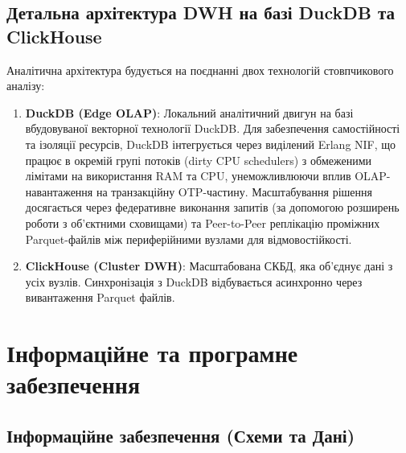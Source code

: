 \documentclass{article}
\begin{document}
\subsection{Детальна архітектура DWH на базі DuckDB та ClickHouse}
Аналітична архітектура будується на поєднанні двох технологій стовпчикового аналізу:
\begin{enumerate}
    \item \textbf{DuckDB (Edge OLAP)}:
    Локальний аналітичний двигун на базі вбудовуваної векторної технології DuckDB. Для забезпечення самостійності та ізоляції ресурсів, DuckDB інтегрується через виділений Erlang NIF, що працює в окремій групі потоків (dirty CPU schedulers) з обмеженими лімітами на використання RAM та CPU, унеможливлюючи вплив OLAP-навантаження на транзакційну OTP-частину. Масштабування рішення досягається через федеративне виконання запитів (за допомогою розширень роботи з об'єктними сховищами) та Peer-to-Peer реплікацію проміжних Parquet-файлів між периферійними вузлами для відмовостійкості.
    \item \textbf{ClickHouse (Cluster DWH)}:
    Масштабована СКБД, яка об'єднує дані з усіх вузлів. Синхронізація з DuckDB відбувається асинхронно через вивантаження Parquet файлів.
\end{enumerate}

\newpage
\section{Інформаційне та програмне забезпечення}

\subsection{Інформаційне забезпечення (Схеми та Дані)}
\end{document}
